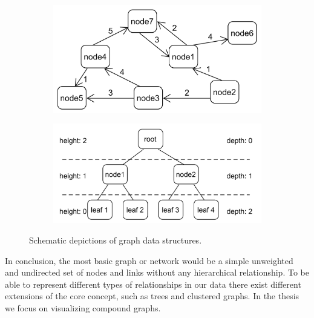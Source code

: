 \begin{figure}[h]
    \centering
    \begin{subfigure}[b]{0.45\columnwidth}
        \centering
        \includegraphics[width=\textwidth]{graphics/weightedDirectedNetwork.png}
        \label{fig:simple_weighted_directed_network}
    \end{subfigure}\hfill
    \begin{subfigure}[b]{0.54\columnwidth}
        \centering
        \includegraphics[width=\textwidth]{graphics/basicTree.png}
        \label{fig:simple_tree}
    \end{subfigure}
    
    \caption{Schematic depictions of graph data structures.} %
    \label{fig:intro} 
  \end{figure}

In conclusion, the most basic graph or network would be a simple unweighted and undirected set of nodes and links without any hierarchical relationship. To be able to represent different types of relationships in our data there exist different extensions of the core concept, such as trees and clustered graphs. In the thesis we focus on visualizing compound graphs.

